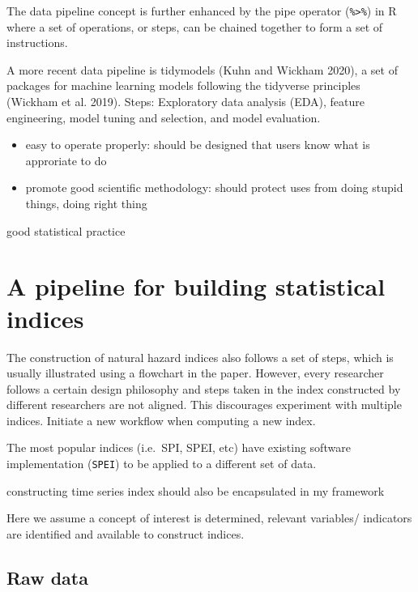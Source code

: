 \documentclass[
]{article}
\providecommand{\tightlist}{%
  \setlength{\itemsep}{0pt}\setlength{\parskip}{0pt}}\usepackage{longtable,booktabs,array}
\begin{document}
The data pipeline concept is further enhanced by the pipe operator
(\texttt{\%\textgreater{}\%}) in R where a set of operations, or steps,
can be chained together to form a set of instructions.

A more recent data pipeline is tidymodels (Kuhn and Wickham 2020), a set
of packages for machine learning models following the tidyverse
principles (Wickham et al. 2019). Steps: Exploratory data analysis
(EDA), feature engineering, model tuning and selection, and model
evaluation.

\begin{itemize}
\tightlist
\item
  easy to operate properly: should be designed that users know what is
  approriate to do
\item
  promote good scientific methodology: should protect uses from doing
  stupid things, doing right thing
\end{itemize}

good statistical practice

\hypertarget{sec-a-pipeline-for-building-statistical-indices}{%
\section{A pipeline for building statistical
indices}\label{sec-a-pipeline-for-building-statistical-indices}}

The construction of natural hazard indices also follows a set of steps,
which is usually illustrated using a flowchart in the paper. However,
every researcher follows a certain design philosophy and steps taken in
the index constructed by different researchers are not aligned. This
discourages experiment with multiple indices. Initiate a new workflow
when computing a new index.

The most popular indices (i.e.~SPI, SPEI, etc) have existing software
implementation (\texttt{SPEI}) to be applied to a different set of data.

constructing time series index should also be encapsulated in my
framework

Here we assume a concept of interest is determined, relevant variables/
indicators are identified and available to construct indices.

\hypertarget{raw-data}{%
\subsection{Raw data}\label{raw-data}}
\end{document}
